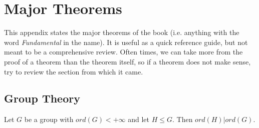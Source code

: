 \chapter{Major Theorems}

This appendix states the major theorems of the book (i.e. anything with the word \textit{Fundamental} in the name). It is useful as a quick reference guide, but not meant to be a comprehensive review. Often times, we can take more from the proof of a theorem than the theorem itself, so if a theorem does not make sense, try to review the section from which it came.

\section*{Group Theory}
\begin{namedtheorem}
    Let $G$ be a group with $ord(G) < +\infty$ and let $H \leq G$. Then $ord(H)|ord(G)$.
\end{namedtheorem}
